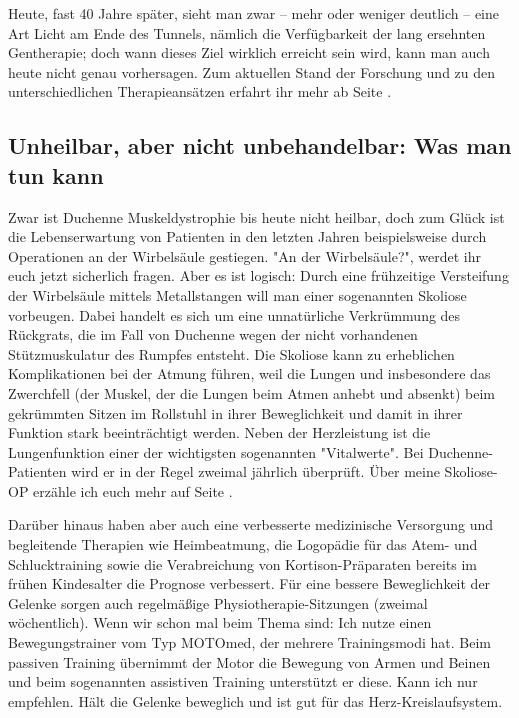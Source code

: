 \documentclass[fontsize=14pt,a4paper,headinclude,DIV=calc,automark]{scrbook}
\begin{document}
Heute, fast 40 Jahre später, sieht man zwar – mehr oder weniger deutlich – eine Art Licht am Ende des Tunnels, nämlich die Verfügbarkeit der lang ersehnten Gentherapie; doch wann dieses Ziel wirklich erreicht sein wird, kann man auch heute nicht genau vorhersagen. Zum aktuellen Stand der Forschung und zu den unterschiedlichen Therapieansätzen erfahrt ihr mehr ab Seite \pageref{sec:therapien}.

\subsection{Unheilbar, aber nicht unbehandelbar: Was man tun kann}

Zwar ist Duchenne Muskeldystrophie bis heute nicht heilbar, doch zum Glück ist die Lebenserwartung von Patienten in den letzten Jahren beispielsweise durch Operationen an der Wirbelsäule gestiegen. "An der Wirbelsäule?", werdet ihr euch jetzt sicherlich fragen. Aber es ist logisch: Durch eine frühzeitige Versteifung der Wirbelsäule mittels Metallstangen will man einer sogenannten Skoliose vorbeugen. Dabei handelt es sich um eine unnatürliche Verkrümmung des Rückgrats, die im Fall von Duchenne wegen der nicht vorhandenen Stützmuskulatur des Rumpfes entsteht. Die Skoliose kann zu erheblichen Komplikationen bei der Atmung führen, weil die Lungen und insbesondere das Zwerchfell (der Muskel, der die Lungen beim Atmen anhebt und absenkt) beim gekrümmten Sitzen im Rollstuhl in ihrer Beweglichkeit und damit in ihrer Funktion stark beeinträchtigt werden. Neben der Herzleistung ist die Lungenfunktion einer der wichtigsten sogenannten "Vitalwerte". Bei Duchenne-Patienten wird er in der Regel zweimal jährlich überprüft. Über meine Skoliose-OP erzähle ich euch mehr auf Seite \pageref{sec:wirbelsaeulenversteifung}.

Darüber hinaus haben aber auch eine verbesserte medizinische Versorgung und begleitende Therapien wie Heimbeatmung, die Logopädie für das Atem- und Schlucktraining sowie die Verabreichung von Kortison-Präparaten bereits im frühen Kindesalter die Prognose verbessert. Für eine bessere Beweglichkeit der Gelenke sorgen auch regelmäßige Physiotherapie-Sitzungen (zweimal wöchentlich). Wenn wir schon mal beim Thema sind: Ich nutze einen Bewegungstrainer vom Typ MOTOmed, der mehrere Trainingsmodi hat. Beim passiven Training übernimmt der Motor die Bewegung von Armen und Beinen und beim sogenannten assistiven Training unterstützt er diese. Kann ich nur empfehlen. Hält die Gelenke beweglich und ist gut für das Herz-Kreislaufsystem.
\end{document}
